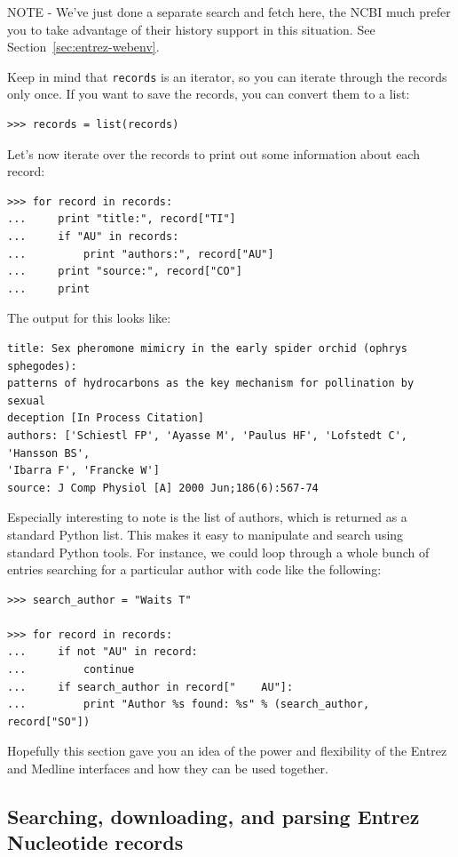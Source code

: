 \documentclass{report}
\begin{document}
NOTE - We've just done a separate search and fetch here, the NCBI much prefer you to take advantage of their history support in this situation.  See Section~\ref{sec:entrez-webenv}.

Keep in mind that \verb+records+ is an iterator, so you can iterate through the records only once. If you want to save the records, you can convert them to a list:
\begin{verbatim}
>>> records = list(records)
\end{verbatim}

Let's now iterate over the records to print out some information about each record:
\begin{verbatim}
>>> for record in records:
...     print "title:", record["TI"]
...     if "AU" in records:
...         print "authors:", record["AU"]
...     print "source:", record["CO"]
...     print
\end{verbatim}

The output for this looks like:
\begin{verbatim}
title: Sex pheromone mimicry in the early spider orchid (ophrys sphegodes):
patterns of hydrocarbons as the key mechanism for pollination by sexual
deception [In Process Citation]
authors: ['Schiestl FP', 'Ayasse M', 'Paulus HF', 'Lofstedt C', 'Hansson BS',
'Ibarra F', 'Francke W']
source: J Comp Physiol [A] 2000 Jun;186(6):567-74
\end{verbatim}

Especially interesting to note is the list of authors, which is returned as a standard Python list. This makes it easy to manipulate and search using standard Python tools. For instance, we could loop through a whole bunch of entries searching for a particular author with code like the following:
\begin{verbatim}
>>> search_author = "Waits T"

>>> for record in records:
...     if not "AU" in record:
...         continue
...     if search_author in record["	AU"]:
...         print "Author %s found: %s" % (search_author, record["SO"])
\end{verbatim}

Hopefully this section gave you an idea of the power and flexibility of the Entrez and Medline interfaces and how they can be used together.

\subsection{Searching, downloading, and parsing Entrez Nucleotide records}
\label{subsec:entrez_example_genbank}
\end{document}

